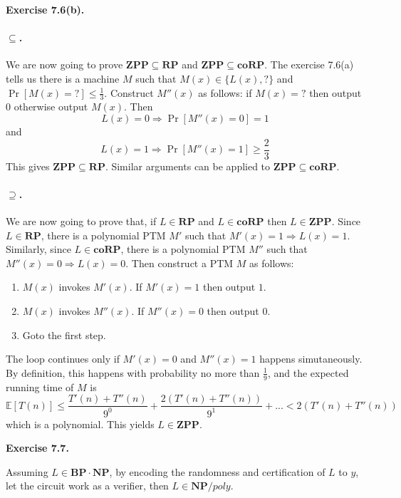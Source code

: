 \documentclass[a4paper]{article}
\newenvironment{exercise}[1]{
	\par
	\noindent\textbf{Exercise #1.}\quad
}{
	\par
	\bigskip
}
\begin{document}
    \begin{exercise}{7.6(b)}
		\paragraph{$\subseteq$.} We are now going to prove $\mathbf{ZPP}\subseteq\mathbf{RP}$ and $\mathbf{ZPP}\subseteq\mathbf{coRP}$. The exercise 7.6(a) tells us there is a machine $M$ such that $M(x)\in\{L(x),?\}$ and $\Pr[M(x)=?]\leq\frac{1}{3}$. Construct $M''(x)$ as follows: if $M(x)=?$ then output $0$ otherwise output $M(x)$. Then
		$$L(x)=0\Rightarrow\Pr[M''(x)=0]=1$$
		and
		$$L(x)=1\Rightarrow\Pr[M''(x)=1]\geq\frac{2}{3}$$
		This gives $\mathbf{ZPP}\subseteq\mathbf{RP}$. Similar arguments can be applied to $\mathbf{ZPP}\subseteq\mathbf{coRP}$. 
		
		\paragraph{$\supseteq$.} We are now going to prove that, if $L\in\mathbf{RP}$ and $L\in\mathbf{coRP}$ then $L\in\mathbf{ZPP}$. Since $L\in\mathbf{RP}$, there is a polynomial PTM $M'$ such that $M'(x)=1\Rightarrow L(x)=1$. Similarly, since $L\in\mathbf{coRP}$, there is a polynomial PTM $M''$ such that $M''(x)=0\Rightarrow L(x)=0$. Then construct a PTM $M$ as follows:
		\begin{enumerate}
			\item $M(x)$ invokes $M'(x)$. If $M'(x)=1$ then output $1$.
			\item $M(x)$ invokes $M''(x)$. If $M''(x)=0$ then output $0$. 
			\item Goto the first step.
		\end{enumerate}
	
		The loop continues only if $M'(x)=0$ and $M''(x)=1$ happens simutaneously. By definition, this happens with probability no more than $\frac{1}{9}$, and the expected running time of $M$ is
		$$\mathbb{E}[T(n)]\leq\frac{T'(n)+T''(n)}{9^0}+\frac{2(T'(n)+T''(n))}{9^1}+...< 2(T'(n)+T''(n))$$
		which is a polynomial. This yields $L\in\mathbf{ZPP}$. 
		
    \end{exercise}

\begin{exercise}{7.7}
Assuming $L\in \textbf{BP}\cdot\textbf{NP}$, by encoding the randomness and certification of $L$ to $y$, let the circuit work as a verifier, then $L\in\textbf{NP}/poly$.
\end{exercise}
\end{document}
